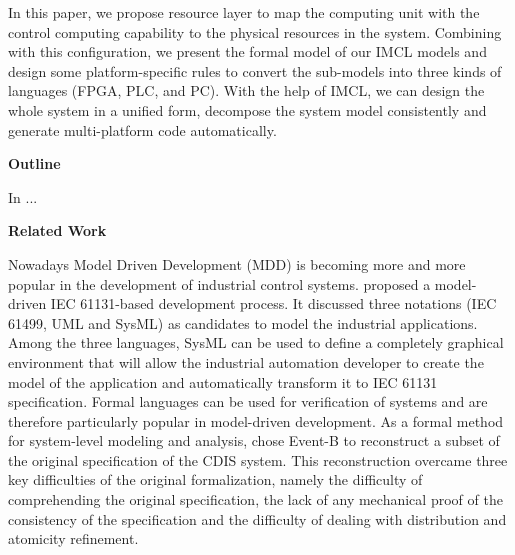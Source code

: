 In this paper, we propose resource layer to map the computing unit with the control computing capability to the physical resources in the system. Combining with this configuration, we present the formal model of our IMCL models and design some platform-specific rules to convert the sub-models into three kinds of languages (FPGA, PLC, and PC). With the help of IMCL, we can design the whole system in a unified form, decompose the system model consistently and generate multi-platform code automatically.

\medskip
\textbf{Outline}
\medskip

In ...


\medskip
\textbf{Related Work}
\medskip

Nowadays Model Driven Development (MDD) is becoming more and more popular in the development of industrial control systems.  \cite{thramboulidis2011towards} proposed a model-driven IEC 61131-based development process. It discussed three notations (IEC 61499, UML and SysML) as candidates to model the industrial applications. Among the three languages, SysML can be used to define a completely graphical environment that will allow the industrial automation developer to create the model of the application and automatically transform it to IEC 61131 specification. Formal languages can be used for verification of systems and are therefore particularly popular in model-driven development. As a formal method for system-level modeling and analysis, \cite{rezazadeh2007redevelopment} chose Event-B to reconstruct a subset of the original specification of the CDIS system. This reconstruction overcame three key difficulties of the original formalization, namely the difficulty of comprehending the original specification, the lack of any mechanical proof of the consistency of the specification and the difficulty of dealing with distribution and atomicity refinement.

